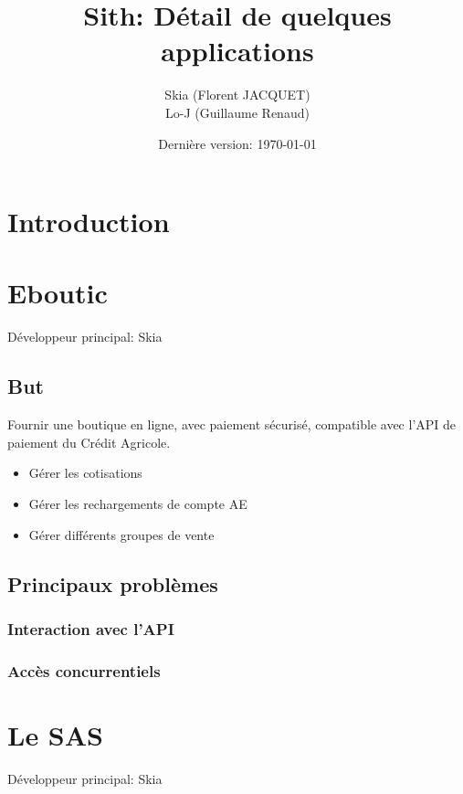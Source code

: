 \documentclass[a4paper]{report}
\title{Sith: Détail de quelques applications}
\author{Skia (Florent JACQUET)\\
Lo-J (Guillaume Renaud)}
\date{Dernière version: \today}
\begin{document}
\maketitle

\tableofcontents

\chapter{Introduction}

\chapter{Eboutic}
\label{sec:eboutic}
\par Développeur principal: Skia

\section{But}
\label{sub:but}
\par Fournir une boutique en ligne, avec paiement sécurisé, compatible avec l'API de paiement du Crédit Agricole.
\begin{itemize}
    \item Gérer les cotisations
    \item Gérer les rechargements de compte AE
    \item Gérer différents groupes de vente
\end{itemize}

\section{Principaux problèmes}
\label{sec:principaux_problemes}

\subsection{Interaction avec l'API}
\label{sub:interaction_avec_l_api}

\subsection{Accès concurrentiels}
\label{sub:acces_concurrentiels}



\chapter{Le SAS}
\label{sec:le_sas}
\par Développeur principal: Skia
\end{document}
